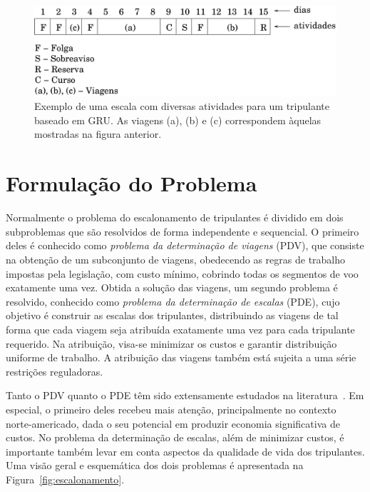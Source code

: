\documentclass[12pt,a4paper]{article}
\newcommand{\zerar}{\setcounter{equation}{0}\setcounter{figure}{0}\setcounter{table}{0}}
\begin{document}
\begin{figure}[htbp]
	\begin{center}
		\includegraphics[scale=0.5]{fig/escala.eps}
		\caption{Exemplo de uma escala com diversas atividades para um tripulante baseado em GRU. As 
		viagens (a), (b) e (c) correspondem àquelas mostradas na figura anterior.}
		\label{fig:escala}
	\end{center}
\end{figure}


\zerar
\section{Formulação do Problema}
\label{sec:formulacao}

Normalmente o problema do escalonamento de tripulantes é dividido em dois subproblemas que são
resolvidos de forma independente e sequencial. O primeiro deles é conhecido como \emph{problema da
determinação de viagens} (PDV), que consiste na obtenção de um subconjunto de viagens, obedecendo as
regras de trabalho impostas pela legislação, com custo mínimo, cobrindo todas os segmentos de voo
exatamente uma vez. Obtida a solução das viagens, um segundo problema é resolvido, conhecido como
\emph{problema da determinação de escalas} (PDE), cujo objetivo é construir as escalas dos
tripulantes, distribuindo as viagens de tal forma que cada viagem seja atribuída exatamente uma vez
para cada tripulante requerido. Na atribuição, visa-se minimizar os custos e garantir distribuição
uniforme de trabalho. A atribuição das viagens também está sujeita a uma série restrições
reguladoras.

Tanto o PDV quanto o PDE têm sido extensamente estudados na literatura~\cite{gopalakrishnan05}. Em
especial, o primeiro deles recebeu mais atenção, principalmente no contexto norte-americado, dada o
seu potencial em produzir economia significativa de custos. No problema da determinação de escalas,
além de minimizar custos, é importante também levar em conta aspectos da qualidade de vida dos
tripulantes. Uma visão geral e esquemática dos dois problemas é apresentada na
Figura~\ref{fig:escalonamento}.
\end{document}
